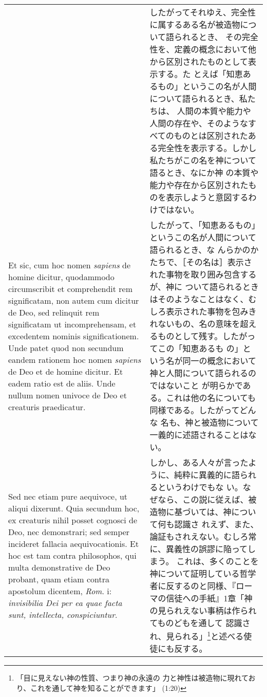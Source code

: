 \documentclass[10pt]{jsarticle} %
\begin{document}
\begin{longtable}{p{21em}p{21em}}
&

したがってそれゆえ、完全性に属するある名が被造物について語られるとき、
その完全性を、定義の概念において他から区別されたものとして表示する。た
とえば「知恵あるもの」というこの名が人間について語られるとき、私たちは、
人間の本質や能力や人間の存在や、そのようなすべてのものとは区別されたあ
る完全性を表示する。しかし私たちがこの名を神について語るとき、なにか神
の本質や能力や存在から区別されたものを表示しようと意図するわけではない。


\\


Et sic, cum hoc nomen {\it sapiens} de homine dicitur, quodammodo
circumscribit et comprehendit rem significatam, non autem cum dicitur
de Deo, sed relinquit rem significatam ut incomprehensam, et
excedentem nominis significationem. Unde patet quod non secundum
eandem rationem hoc nomen {\it sapiens} de Deo et de homine
dicitur. Et eadem ratio est de aliis. Unde nullum nomen univoce de Deo
et creaturis praedicatur.


&

したがって、「知恵あるもの」というこの名が人間について語られるとき、な
んらかのかたちで、［その名は］表示された事物を取り囲み包含するが、神に
ついて語られるときはそのようなことはなく、むしろ表示された事物を包みき
れないもの、名の意味を超えるものとして残す。したがってこの「知恵あるも
の」という名が同一の概念において神と人間について語られるのではないこと
が明らかである。これは他の名についても同様である。したがってどんな
名も、神と被造物について一義的に述語されることはない。

\\

Sed nec etiam pure aequivoce, ut aliqui dixerunt. Quia secundum hoc,
ex creaturis nihil posset cognosci de Deo, nec demonstrari; sed semper
incideret fallacia aequivocationis. Et hoc est tam contra philosophos,
qui multa demonstrative de Deo probant, quam etiam contra apostolum
dicentem, {\it Rom}. {\sc i}: {\it invisibilia Dei per ea quae facta
sunt, intellecta, conspiciuntur}.


&

しかし、ある人々が言ったように、純粋に異義的に語られるというわけでもな
い。なぜなら、この説に従えば、被造物に基づいては、神について何も認識さ
れえず、また、論証もされえない。むしろ常に、異義性の誤謬に陥ってしまう。
これは、多くのことを神について証明している哲学者に反するのと同様、『ロー
マの信徒への手紙』1章「神の見られえない事柄は作られてものどもを通して
認識され、見られる」\footnote{「目に見えない神の性質、つまり神の永遠の
力と神性は被造物に現れており、これを通して神を知ることができます」
(1:20) }と述べる使徒にも反する。


\end{longtable}
\end{document}
